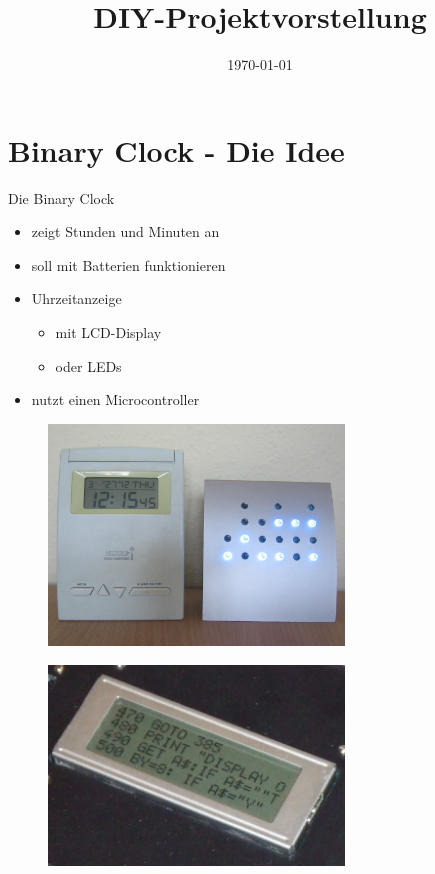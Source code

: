 \documentclass{beamer}
\title{DIY-Projektvorstellung}
\author{}
\date{\today}
\begin{document}
\maketitle

\section{Binary Clock - Die Idee}
\frame{\tableofcontents[currentsection]}
\begin{frame}
Die Binary Clock
		\begin{itemize}
			\item zeigt Stunden und Minuten an 		\pause 
			\item soll mit Batterien funktionieren	\pause 
			\item Uhrzeitanzeige \pause
			\begin{itemize}
				\item mit LCD-Display \pause
				\item oder LEDs \pause
			\end{itemize}
			\item nutzt einen Microcontroller
		\end{itemize} 
\end{frame}

\begin{frame}
\begin{figure}[ht]
	\centering
	\includegraphics[width=0.7\textwidth]{img/Digital-BCD-clock.jpg}
\end{figure}
\end{frame}


\begin{frame}
	\begin{figure}[ht]
		\centering
		\includegraphics[width=0.7\textwidth]{img/DTV-LCD-MOD.jpg}
	\end{figure}
\end{frame}
\end{document}
